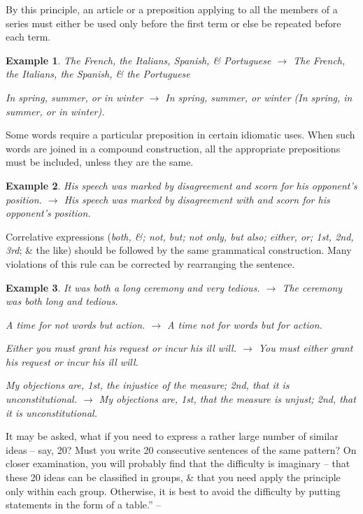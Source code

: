 \documentclass{article}
\newtheorem{example}{Example}
\begin{document}
By this principle, an article or a preposition applying to all the members of a series must either be used only before the first term or else be repeated before each term.
\begin{example}
	The French, the Italians, Spanish, \& Portuguese $\to$ The French, the Italians, the Spanish, \& the Portuguese
	
	In spring, summer, or in winter $\to$ In spring, summer, or winter (In spring, in summer, or in winter).
\end{example}
Some words require a particular preposition in certain idiomatic uses. When such words are joined in a compound construction, all the appropriate prepositions must be included, unless they are the same.
\begin{example}
	His speech was marked by disagreement and scorn for his opponent's position. $\to$ His speech was marked by disagreement with and scorn for his opponent's position.
\end{example}
Correlative expressions ({\it both, \&; not, but; not only, but also; either, or; 1st, 2nd, 3rd}; \& the like) should be followed by the same grammatical construction. Many violations of this rule can be corrected by rearranging the sentence.
\begin{example}
	It was both a long ceremony and very tedious. $\to$ The ceremony was both long and tedious.
	
	A time for not words but action. $\to$ A time not for words but for action.
	
	Either you must grant his request or incur his ill will. $\to$ You must either grant his request or incur his ill will.
	
	My objections are, 1st, the injustice of the measure; 2nd, that it is unconstitutional. $\to$ My objections are, 1st, that the measure is unjust; 2nd, that it is unconstitutional.
\end{example}
It may be asked, what if you need to express a rather large number of similar ideas -- say, 20? Must you write 20 consecutive sentences of the same pattern? On closer examination, you will probably find that the difficulty is imaginary -- that these 20 ideas can be classified in groups, \& that you need apply the principle only within each group. Otherwise, it is best to avoid the difficulty by putting statements in the form of a table.'' -- \cite[pp. 41--42]{Strunk_White_element_style}

\end{document}
